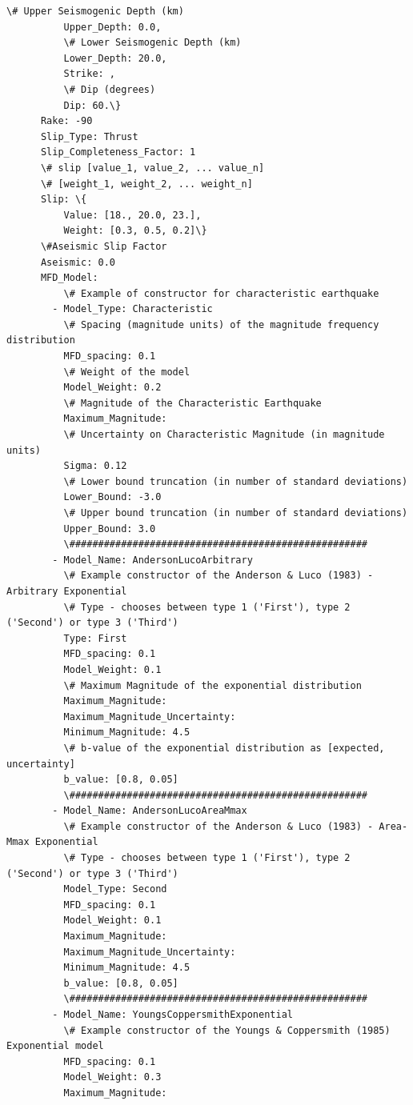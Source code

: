\begin{Verbatim}[frame=single, commandchars=\\\{\}, fontsize=\scriptsize]
          \# Upper Seismogenic Depth (km)
          Upper_Depth: 0.0,
          \# Lower Seismogenic Depth (km)
          Lower_Depth: 20.0,
          Strike: ,
          \# Dip (degrees)
          Dip: 60.\}
      Rake: -90
      Slip_Type: Thrust
      Slip_Completeness_Factor: 1
      \# slip [value_1, value_2, ... value_n]
      \# [weight_1, weight_2, ... weight_n]
      Slip: \{
          Value: [18., 20.0, 23.],
          Weight: [0.3, 0.5, 0.2]\}
      \#Aseismic Slip Factor
      Aseismic: 0.0
      MFD_Model:
          \# Example of constructor for characteristic earthquake
        - Model_Type: Characteristic
          \# Spacing (magnitude units) of the magnitude frequency distribution
          MFD_spacing: 0.1
          \# Weight of the model
          Model_Weight: 0.2
          \# Magnitude of the Characteristic Earthquake
          Maximum_Magnitude:
          \# Uncertainty on Characteristic Magnitude (in magnitude units)
          Sigma: 0.12
          \# Lower bound truncation (in number of standard deviations)
          Lower_Bound: -3.0
          \# Upper bound truncation (in number of standard deviations)
          Upper_Bound: 3.0
          \####################################################
        - Model_Name: AndersonLucoArbitrary
          \# Example constructor of the Anderson & Luco (1983) - Arbitrary Exponential
          \# Type - chooses between type 1 ('First'), type 2 ('Second') or type 3 ('Third')
          Type: First
          MFD_spacing: 0.1
          Model_Weight: 0.1
          \# Maximum Magnitude of the exponential distribution
          Maximum_Magnitude:
          Maximum_Magnitude_Uncertainty:
          Minimum_Magnitude: 4.5
          \# b-value of the exponential distribution as [expected, uncertainty]
          b_value: [0.8, 0.05]
          \####################################################
        - Model_Name: AndersonLucoAreaMmax
          \# Example constructor of the Anderson & Luco (1983) - Area-Mmax Exponential
          \# Type - chooses between type 1 ('First'), type 2 ('Second') or type 3 ('Third')
          Model_Type: Second
          MFD_spacing: 0.1
          Model_Weight: 0.1
          Maximum_Magnitude:
          Maximum_Magnitude_Uncertainty:
          Minimum_Magnitude: 4.5
          b_value: [0.8, 0.05]
          \####################################################
        - Model_Name: YoungsCoppersmithExponential
          \# Example constructor of the Youngs & Coppersmith (1985) Exponential model
          MFD_spacing: 0.1
          Model_Weight: 0.3
          Maximum_Magnitude:

\end{Verbatim}

